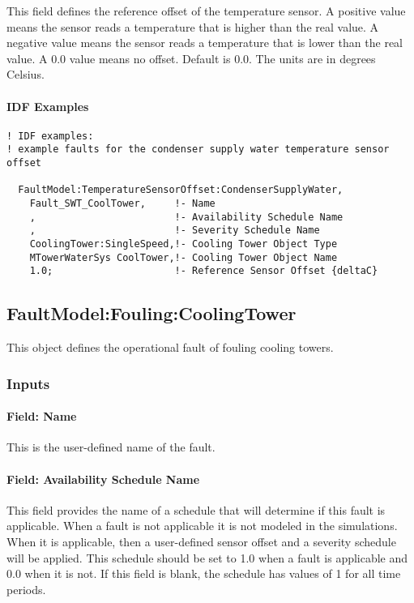 This field defines the reference offset of the temperature sensor. A positive value means the sensor reads a temperature that is higher than the real value. A negative value means the sensor reads a temperature that is lower than the real value. A 0.0 value means no offset. Default is 0.0. The units are in degrees Celsius.

\paragraph{IDF Examples}

\begin{lstlisting}
! IDF examples:
! example faults for the condenser supply water temperature sensor offset

  FaultModel:TemperatureSensorOffset:CondenserSupplyWater,
    Fault_SWT_CoolTower,     !- Name
    ,                        !- Availability Schedule Name
    ,                        !- Severity Schedule Name
    CoolingTower:SingleSpeed,!- Cooling Tower Object Type
    MTowerWaterSys CoolTower,!- Cooling Tower Object Name
    1.0;                     !- Reference Sensor Offset {deltaC}

\end{lstlisting}


\subsection{FaultModel:Fouling:CoolingTower}\label{faultmodelfoulingcoolingtower}

This object defines the operational fault of fouling cooling towers.

\subsubsection{Inputs}

\paragraph{Field: Name}

This is the user-defined name of the fault.

\paragraph{Field: Availability Schedule Name}

This field provides the name of a schedule that will determine if this fault is applicable. When a fault is not applicable it is not modeled in the simulations. When it is applicable, then a user-defined sensor offset and a severity schedule will be applied. This schedule should be set to 1.0 when a fault is applicable and 0.0 when it is not. If this field is blank, the schedule has values of 1 for all time periods.

